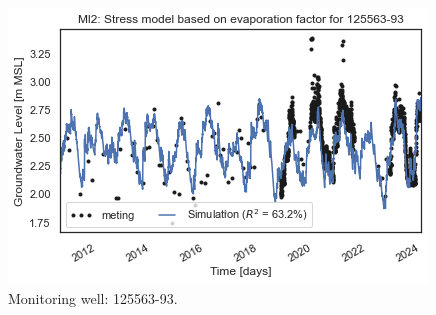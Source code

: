 \begin{figure}[htbp]
\begin{minipage}{0.32\textwidth}
        \label{SM: 125563-92}
    \end{minipage}
    \hfill
    \begin{minipage}{0.32\textwidth}
        \centering
        \includegraphics[width=\linewidth]{frontmatter/Heijplaat-fig/125563-93.png}
        \caption{Monitoring well: 125563-93.}
        \label{SM: 125563-93}
    \end{minipage}
\end{figure}
